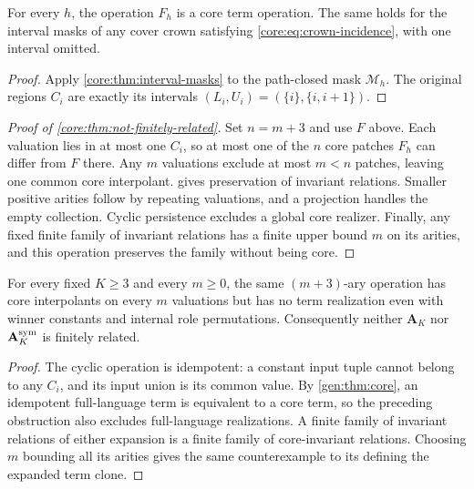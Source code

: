 \begin{lemma}\label{core:lem:crown-patch}
For every $h$, the operation $F_h$ is a core term operation. The same
holds for the interval masks of any cover crown satisfying
\eqref{core:eq:crown-incidence}, with one interval omitted.
\end{lemma}
\begin{proof}
Apply \cref{core:thm:interval-masks} to the path-closed mask
$\mathcal M_h$. The original regions $C_i$ are exactly its intervals
$(L_i,U_i)=(\{i\},\{i,i+1\})$.
\end{proof}

\begin{proof}[Proof of \cref{core:thm:not-finitely-related}]
Set $n=m+3$ and use $F$ above. Each valuation lies in at most one
$C_i$, so at most one of the $n$ core patches $F_h$ can differ from
$F$ there. Any $m$ valuations exclude at most $m<n$ patches, leaving
one common core interpolant. 
gives preservation of invariant relations. Smaller positive arities follow
by repeating valuations, and a projection handles the empty collection.
Cyclic persistence excludes a global core realizer.
Finally, any fixed finite family of invariant relations has a finite upper
bound $m$ on its arities, and this operation preserves the family without
being core.
\end{proof}

\begin{corollary}
\label{core:cor:full-not-finitely-related}
For every fixed $K\geq3$ and every $m\geq0$, the same $(m+3)$-ary
operation has core interpolants on every $m$ valuations but has no term
realization even with winner constants and internal role permutations.
Consequently neither $\mathbf A_K$ nor $\mathbf A_K^{\rm sym}$
is finitely related.
\end{corollary}
\begin{proof}
The cyclic operation is idempotent: a constant input tuple cannot belong
to any $C_i$, and its input union is its common value. By
\cref{gen:thm:core}, an idempotent full-language term is equivalent
to a core term, so the preceding obstruction also excludes full-language
realizations. A finite family of invariant relations of either expansion
is a finite family of core-invariant relations. Choosing $m$ bounding all its
arities gives the same counterexample to its defining the expanded
term clone.
\end{proof}

